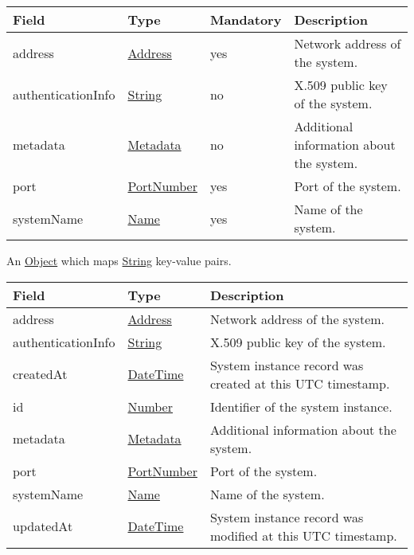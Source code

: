 \documentclass[a4paper]{arrowhead}
\newcommand{\pref}[1]{{\textcolor{ArrowheadGrey}{\hyperref[sec:model:primitives:#1]{#1}}}}
\begin{document}
\label{sec:model:SystemRequest}

\begin{table}[ht!]
\begin{tabularx}{\textwidth}{| p{4cm} | p{4cm} | p{2cm} | X |} \hline
\rowcolor{gray!33} Field & Type & Mandatory & Description \\ \hline

address &\pref{Address} & yes & Network address of the system. \\ \hline
authenticationInfo &\pref{String} & no & X.509 public key of the system. \\ \hline
metadata &\hyperref[sec:model:Metadata]{Metadata} & no & Additional information about the system. \\ \hline
port &\pref{PortNumber} & yes & Port of the system. \\ \hline
systemName &\pref{Name} & yes & Name of the system. \\ \hline
\end{tabularx}
\end{table}

\label{sec:model:Metadata}

An \pref{Object} which maps \pref{String} key-value pairs.

\label{sec:model:SystemResponse}

\begin{table}[ht!]
\begin{tabularx}{\textwidth}{| p{4.25cm} | p{3.5cm} | X |} \hline
\rowcolor{gray!33} Field & Type & Description \\ \hline

address &\pref{Address} & Network address of the system. \\ \hline
authenticationInfo &\pref{String} & X.509 public key of the system. \\ \hline
createdAt & \pref{DateTime} & System instance record was created at this UTC time\-stamp. \\ \hline
id & \pref{Number} & Identifier of the system instance. \\ \hline
metadata &\hyperref[sec:model:Metadata]{Metadata} & Additional information about the system. \\ \hline
port &\pref{PortNumber} & Port of the system. \\ \hline
systemName &\pref{Name} & Name of the system. \\ \hline
updatedAt & \pref{DateTime} & System instance record was modified at this UTC time\-stamp. \\ \hline
\end{tabularx}
\end{table}
\end{document}
